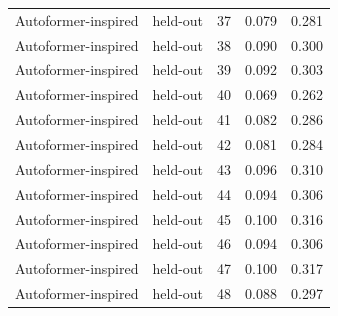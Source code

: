 \begin{tabular}{llrrr}
Autoformer-inspired & held-out & 37 & 0.079 & 0.281 \\
Autoformer-inspired & held-out & 38 & 0.090 & 0.300 \\
Autoformer-inspired & held-out & 39 & 0.092 & 0.303 \\
Autoformer-inspired & held-out & 40 & 0.069 & 0.262 \\
Autoformer-inspired & held-out & 41 & 0.082 & 0.286 \\
Autoformer-inspired & held-out & 42 & 0.081 & 0.284 \\
Autoformer-inspired & held-out & 43 & 0.096 & 0.310 \\
Autoformer-inspired & held-out & 44 & 0.094 & 0.306 \\
Autoformer-inspired & held-out & 45 & 0.100 & 0.316 \\
Autoformer-inspired & held-out & 46 & 0.094 & 0.306 \\
Autoformer-inspired & held-out & 47 & 0.100 & 0.317 \\
Autoformer-inspired & held-out & 48 & 0.088 & 0.297 \\
\bottomrule
\end{tabular}

